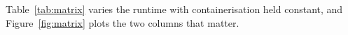 \documentclass[pdflatex,sn-basic,twocolumn]{sn-jnl}%
\providecommand{\DIFdelbegin}{} %
\newcommand{\DIFscaledelfig}{0.5}
\newlength{\DIFdelgraphicswidth} %
\newlength{\DIFdelgraphicsheight} %
\newcommand{\DIFdelincludegraphics}[2][]{%
\sbox{\DIFdelgraphicsbox}{\DIFOincludegraphics[#1]{#2}}%
\settoboxwidth{\DIFdelgraphicswidth}{\DIFdelgraphicsbox} %
\settoboxtotalheight{\DIFdelgraphicsheight}{\DIFdelgraphicsbox} %
\scalebox{\DIFscaledelfig}{%
\parbox[b]{\DIFdelgraphicswidth}{\usebox{\DIFdelgraphicsbox}\\[-\baselineskip] \rule{\DIFdelgraphicswidth}{0em}}\llap{\resizebox{\DIFdelgraphicswidth}{\DIFdelgraphicsheight}{%
\setlength{\unitlength}{\DIFdelgraphicswidth}%
\begin{picture}(1,1)%
\thicklines\linethickness{2pt} %
{\color[rgb]{1,0,0}\put(0,0){\framebox(1,1){}}}%
{\color[rgb]{1,0,0}\put(0,0){\line( 1,1){1}}}%
{\color[rgb]{1,0,0}\put(0,1){\line(1,-1){1}}}%
\end{picture}%
}\hspace*{3pt}}} %
} %
\DeclareRobustCommand{\DIFdelbegin}{\DIFOdelbegin \let\includegraphics\DIFdelincludegraphics} %
\begin{document}
Table~\ref{tab:matrix} varies the runtime with containerisation held constant,
and Figure~\ref{fig:matrix} plots the two columns that matter.

\DIFdelbegin %
\end{document}

